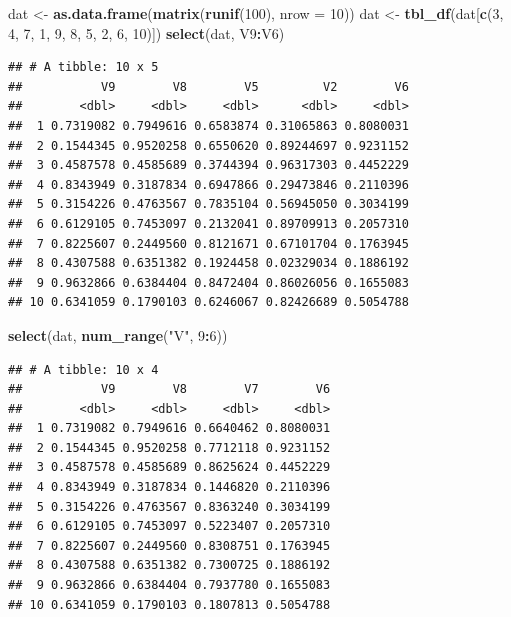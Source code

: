 \documentclass[]{book}
\newenvironment{Shaded}{\begin{snugshade}}{\end{snugshade}}
\newcommand{\KeywordTok}[1]{\textcolor[rgb]{0.13,0.29,0.53}{\textbf{#1}}}
\newcommand{\DataTypeTok}[1]{\textcolor[rgb]{0.13,0.29,0.53}{#1}}
\newcommand{\DecValTok}[1]{\textcolor[rgb]{0.00,0.00,0.81}{#1}}
\newcommand{\StringTok}[1]{\textcolor[rgb]{0.31,0.60,0.02}{#1}}
\newcommand{\OperatorTok}[1]{\textcolor[rgb]{0.81,0.36,0.00}{\textbf{#1}}}
\newcommand{\NormalTok}[1]{#1}
\begin{document}
\begin{Shaded}
\begin{Highlighting}[]
\NormalTok{dat <-}\StringTok{ }\KeywordTok{as.data.frame}\NormalTok{(}\KeywordTok{matrix}\NormalTok{(}\KeywordTok{runif}\NormalTok{(}\DecValTok{100}\NormalTok{), }\DataTypeTok{nrow =} \DecValTok{10}\NormalTok{))}
\NormalTok{dat <-}\StringTok{ }\KeywordTok{tbl_df}\NormalTok{(dat[}\KeywordTok{c}\NormalTok{(}\DecValTok{3}\NormalTok{, }\DecValTok{4}\NormalTok{, }\DecValTok{7}\NormalTok{, }\DecValTok{1}\NormalTok{, }\DecValTok{9}\NormalTok{, }\DecValTok{8}\NormalTok{, }\DecValTok{5}\NormalTok{, }\DecValTok{2}\NormalTok{, }\DecValTok{6}\NormalTok{, }\DecValTok{10}\NormalTok{)])}
\KeywordTok{select}\NormalTok{(dat, V9}\OperatorTok{:}\NormalTok{V6)}
\end{Highlighting}
\end{Shaded}

\begin{verbatim}
## # A tibble: 10 x 5
##           V9        V8        V5         V2        V6
##        <dbl>     <dbl>     <dbl>      <dbl>     <dbl>
##  1 0.7319082 0.7949616 0.6583874 0.31065863 0.8080031
##  2 0.1544345 0.9520258 0.6550620 0.89244697 0.9231152
##  3 0.4587578 0.4585689 0.3744394 0.96317303 0.4452229
##  4 0.8343949 0.3187834 0.6947866 0.29473846 0.2110396
##  5 0.3154226 0.4763567 0.7835104 0.56945050 0.3034199
##  6 0.6129105 0.7453097 0.2132041 0.89709913 0.2057310
##  7 0.8225607 0.2449560 0.8121671 0.67101704 0.1763945
##  8 0.4307588 0.6351382 0.1924458 0.02329034 0.1886192
##  9 0.9632866 0.6384404 0.8472404 0.86026056 0.1655083
## 10 0.6341059 0.1790103 0.6246067 0.82426689 0.5054788
\end{verbatim}

\begin{Shaded}
\begin{Highlighting}[]
\KeywordTok{select}\NormalTok{(dat, }\KeywordTok{num_range}\NormalTok{(}\StringTok{"V"}\NormalTok{, }\DecValTok{9}\OperatorTok{:}\DecValTok{6}\NormalTok{))}
\end{Highlighting}
\end{Shaded}

\begin{verbatim}
## # A tibble: 10 x 4
##           V9        V8        V7        V6
##        <dbl>     <dbl>     <dbl>     <dbl>
##  1 0.7319082 0.7949616 0.6640462 0.8080031
##  2 0.1544345 0.9520258 0.7712118 0.9231152
##  3 0.4587578 0.4585689 0.8625624 0.4452229
##  4 0.8343949 0.3187834 0.1446820 0.2110396
##  5 0.3154226 0.4763567 0.8363240 0.3034199
##  6 0.6129105 0.7453097 0.5223407 0.2057310
##  7 0.8225607 0.2449560 0.8308751 0.1763945
##  8 0.4307588 0.6351382 0.7300725 0.1886192
##  9 0.9632866 0.6384404 0.7937780 0.1655083
## 10 0.6341059 0.1790103 0.1807813 0.5054788
\end{verbatim}
\end{document}
